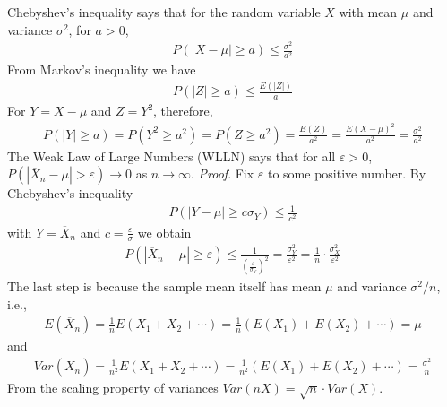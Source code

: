 \documentclass[11pt,a4paper]{article}
\begin{document}
Chebyshev's inequality says that for the random variable \(X\) with mean
\(\mu\) and variance \(\sigma^{2}\), for \(a > 0\),
\begin{align}
P\left( |X - \mu| \geq a \right) \leq \frac{\sigma^{2}}{a^{2}}
\end{align}
From Markov's inequality we have
\begin{align}
P\left( |Z| \geq a \right) \leq \frac{E\left( |Z| \right)}{a}
\end{align}
For \(Y = X - \mu\) and \(Z = Y^{2}\), therefore,
\begin{align}
P\left( |Y| \geq a \right) = 
P\left( Y^{2} \geq a^{2} \right) = 
P\left( Z \geq a^{2} \right) = 
\frac{E(Z)}{a^{2}} = 
\frac{E(X - \mu)^{2}}{a^{2}} = 
\frac{\sigma^{2}}{a^{2}}
\end{align}
The Weak Law of Large Numbers (WLLN) says that for all \(\varepsilon > 0\),
\(P\left( \left| {\overline{X}}_{n} - \mu \right| > \varepsilon \right) \rightarrow 0\)
as \(n \rightarrow \infty\). 
\emph{Proof}. 
Fix \(\varepsilon\) to some positive number. 
By Chebyshev's inequality
\begin{align}
P\left( |Y - \mu| \geq c\sigma_{Y} \right) \leq \frac{1}{c^{2}}
\end{align}
with \(Y = {\overline{X}}_{n}\) and \(c = \frac{\varepsilon}{\sigma}\) we obtain
\begin{align}
P\left( \left| {\overline{X}}_{n} - \mu \right| \geq \varepsilon \right) \leq \frac{1}{\left( \frac{\varepsilon}{\sigma_{Y}} \right)^{2}} = 
\frac{\sigma_{Y}^{2}}{\varepsilon^{2}} = 
\frac{1}{n} \cdot \frac{\sigma_{X}^{2}}{\varepsilon^{2}}
\end{align}
The last step is because the sample mean itself has mean \(\mu\) and variance \(\sigma^{2}/n\), i.e.,
\begin{align}
E\left( {\overline{X}}_{n} \right) = 
\frac{1}{n}E\left( X_{1} + X_{2} + \cdots \right) = 
\frac{1}{n}\left( E\left( X_{1} \right) + E\left( X_{2} \right) + \cdots \right) = 
\mu
\end{align}
and
\begin{align}
Var\left( {\overline{X}}_{n} \right) = 
\frac{1}{n^{2}}E\left( X_{1} + X_{2} + \cdots \right) = 
\frac{1}{n^{2}}\left( E\left( X_{1} \right) + E\left( X_{2} \right) + \cdots \right) = 
\frac{\sigma^{2}}{n}
\end{align}
From the scaling property of variances
\(Var(nX) = \sqrt{n} \cdot Var(X)\).
\end{document}
